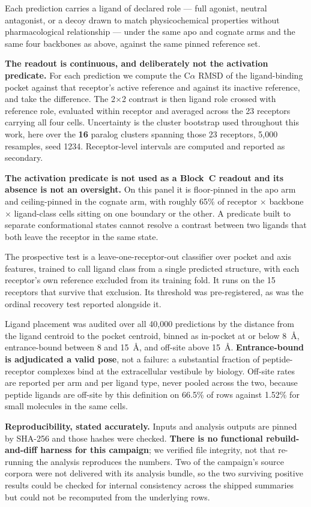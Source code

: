 Each prediction carries a ligand of declared role --- full agonist, neutral
antagonist, or a decoy drawn to match physicochemical properties without
pharmacological relationship --- under the same apo and cognate arms and the
same four backbones as above, against the same pinned reference set.

\textbf{The readout is continuous, and deliberately not the activation
predicate.} For each prediction we compute the C$\alpha$ RMSD of the
ligand-binding pocket against that receptor's active reference and against its
inactive reference, and take the difference. The 2$\times$2 contrast is then
ligand role crossed with reference role, evaluated within receptor and averaged
across the 23 receptors carrying all four cells. Uncertainty is the cluster
bootstrap used throughout this work, here over the \textbf{16} paralog clusters
spanning those 23 receptors, 5{,}000 resamples, seed 1234. Receptor-level
intervals are computed and reported as secondary.

\textbf{The activation predicate is not used as a Block~C readout and its
absence is not an oversight.} On this panel it is floor-pinned in the apo arm
and ceiling-pinned in the cognate arm, with roughly 65\% of receptor $\times$
backbone $\times$ ligand-class cells sitting on one boundary or the other. A
predicate built to separate conformational states cannot resolve a contrast
between two ligands that both leave the receptor in the same state.

The prospective test is a leave-one-receptor-out classifier over pocket and axis
features, trained to call ligand class from a single predicted structure, with
each receptor's own reference excluded from its training fold. It runs on the
15 receptors that survive that exclusion. Its threshold was pre-registered, as
was the ordinal recovery test reported alongside it.

Ligand placement was audited over all 40{,}000 predictions by the distance from
the ligand centroid to the pocket centroid, binned as in-pocket at or below
8~\AA, entrance-bound between 8 and 15~\AA, and off-site above 15~\AA.
\textbf{Entrance-bound is adjudicated a valid pose}, not a failure: a
substantial fraction of peptide-receptor complexes bind at the extracellular
vestibule by biology. Off-site rates are reported per arm and per ligand type,
never pooled across the two, because peptide ligands are off-site by this
definition on 66.5\% of rows against 1.52\% for small molecules in the same
cells.

\textbf{Reproducibility, stated accurately.} Inputs and analysis outputs are
pinned by SHA-256 and those hashes were checked. \textbf{There is no functional
rebuild-and-diff harness for this campaign}; we verified file integrity, not
that re-running the analysis reproduces the numbers. Two of the campaign's
source corpora were not delivered with its analysis bundle, so the two
surviving positive results could be checked for internal consistency across the
shipped summaries but could not be recomputed from the underlying rows.

